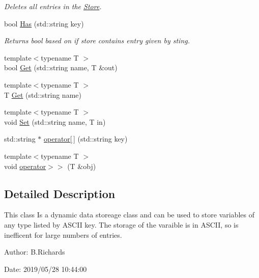 \begin{DoxyCompactItemize}
\begin{DoxyCompactList}\small\item\em Deletes all entries in the \hyperlink{classStore}{Store}. \end{DoxyCompactList}\item 
bool \hyperlink{classStore_a41eaa81c4612fb5bdbf850afb6428977}{Has} (std\-::string key)
\begin{DoxyCompactList}\small\item\em Returns bool based on if store contains entry given by sting. \end{DoxyCompactList}\item 
{\footnotesize template$<$typename T $>$ }\\bool \hyperlink{classStore_abdc0134daa34b808328070f5d6b295f3}{Get} (std\-::string name, T \&out)
\item 
{\footnotesize template$<$typename T $>$ }\\T \hyperlink{classStore_a26d26db839f734e0af5404b7dac40dae}{Get} (std\-::string name)
\item 
{\footnotesize template$<$typename T $>$ }\\void \hyperlink{classStore_af586739813ce18da6f5e3561d134a814}{Set} (std\-::string name, T in)
\item 
std\-::string $\ast$ \hyperlink{classStore_a790ca02bc7d11648edf0c8d5df3751fe}{operator\mbox{[}$\,$\mbox{]}} (std\-::string key)
\item 
{\footnotesize template$<$typename T $>$ }\\void \hyperlink{classStore_abe9b65d1308c43dc4158b00d6aed7385}{operator$>$$>$} (T \&obj)
\end{DoxyCompactItemize}


\subsection{Detailed Description}
This class Is a dynamic data storeage class and can be used to store variables of any type listed by A\-S\-C\-I\-I key. The storage of the varaible is in A\-S\-C\-I\-I, so is inefficent for large numbers of entries.

\begin{DoxyParagraph}{Author\-:}
B.\-Richards 
\end{DoxyParagraph}
\begin{DoxyParagraph}{Date\-:}
2019/05/28 10\-:44\-:00 
\end{DoxyParagraph}


